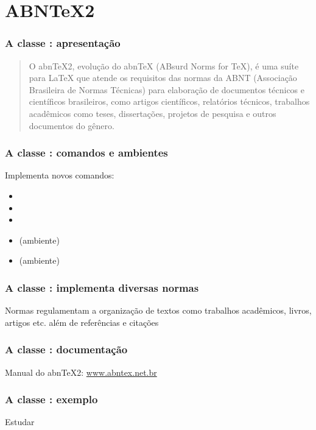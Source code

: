 \section{ABN\TeX2}

\begin{frame}
  \frametitle{A classe : apresentação}
  \large
  \begin{quote}
    O abnTeX2, evolução do abnTeX (ABsurd Norms for TeX), é uma suíte para
    LaTeX que atende os requisitos das normas da ABNT (Associação Brasileira de
    Normas Técnicas) para elaboração de documentos técnicos e científicos
    brasileiros, como artigos científicos, relatórios técnicos, trabalhos
    acadêmicos como teses, dissertações, projetos de pesquisa e outros
    documentos do gênero.
  \end{quote}
\end{frame}

\begin{frame}
  \frametitle{A classe : comandos e ambientes}
  \LARGE
  Implementa novos comandos:

  \begin{itemize}
    \item\latexcode{\titulo}
    \item\latexcode{\autor}
    \item\latexcode{\imprimircapa}
    \item{} (ambiente)
    \item{} (ambiente)
  \end{itemize}
\end{frame}

\begin{frame}
  \frametitle{A classe : implementa diversas normas}
  \LARGE
  Normas regulamentam a organização de textos como trabalhos acadêmicos,
  livros, artigos etc. além de referências e citações
\end{frame}

\begin{frame}
  \frametitle{A classe : documentação}
  \LARGE
  Manual do abnTeX2: \url{www.abntex.net.br}
\end{frame}

\begin{frame}
  \frametitle{A classe : exemplo}
  \huge
  Estudar 
\end{frame}
